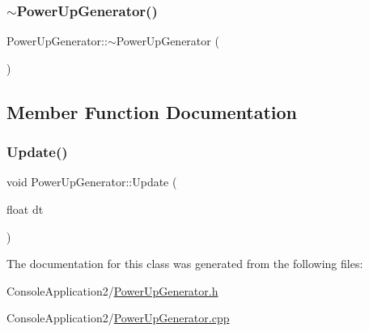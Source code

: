 \subsubsection{\texorpdfstring{$\sim$\+Power\+Up\+Generator()}{~PowerUpGenerator()}}
{\footnotesize\ttfamily Power\+Up\+Generator\+::$\sim$\+Power\+Up\+Generator (\begin{DoxyParamCaption}{ }\end{DoxyParamCaption})}



\subsection{Member Function Documentation}
\hypertarget{class_power_up_generator_a49002c37923219a8289739b7432e187d}{}\label{class_power_up_generator_a49002c37923219a8289739b7432e187d} 
\subsubsection{\texorpdfstring{Update()}{Update()}}
{\footnotesize\ttfamily void Power\+Up\+Generator\+::\+Update (\begin{DoxyParamCaption}\item[{float}]{dt }\end{DoxyParamCaption})}



The documentation for this class was generated from the following files\+:\begin{DoxyCompactItemize}
\item 
Console\+Application2/\hyperlink{_power_up_generator_8h}{Power\+Up\+Generator.\+h}\item 
Console\+Application2/\hyperlink{_power_up_generator_8cpp}{Power\+Up\+Generator.\+cpp}\end{DoxyCompactItemize}
